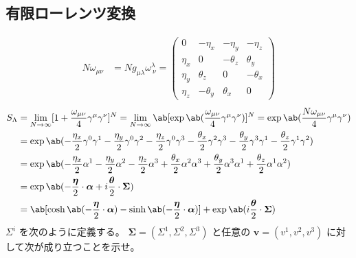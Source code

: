 \documentclass[uplatex,dvipdfmx,a4paper,11pt]{jlreq}
\theoremstyle{definition}
\numberwithin{equation}{section}
\begin{document}
\subsection{有限ローレンツ変換}
\begin{align}
  N\omega_{\mu\nu} & = Ng_{\mu\lambda}\omega_{\ \nu}^\lambda = \begin{pmatrix}
                                                                 0      & -\eta_x   & -\eta_y   & -\eta_z   \\
                                                                 \eta_x & 0         & -\theta_z & \theta_y  \\
                                                                 \eta_y & \theta_z  & 0         & -\theta_x \\
                                                                 \eta_z & -\theta_y & \theta_x  & 0
                                                               \end{pmatrix}
\end{align}
\begin{align}
  S_\Lambda & = \lim_{N\to\infty}[1 + \frac{\omega_{\mu\nu}}{4}\gamma^\mu\gamma^\nu]^N = \lim_{N\to\infty}\ab[\exp\ab(\frac{\omega_{\mu\nu}}{4}\gamma^\mu\gamma^\nu)]^N = \exp\ab(\frac{N\omega_{\mu\nu}}{4}\gamma^\mu\gamma^\nu)                \\
            & = \exp\ab(- \frac{\eta_x}{2}\gamma^0\gamma^1 - \frac{\eta_y}{2}\gamma^0\gamma^2 - \frac{\eta_z}{2}\gamma^0\gamma^3 - \frac{\theta_x}{2}\gamma^2\gamma^3 - \frac{\theta_y}{2}\gamma^3\gamma^1 - \frac{\theta_z}{2}\gamma^1\gamma^2) \\
            & = \exp\ab(- \frac{\eta_x}{2}\alpha^1 - \frac{\eta_y}{2}\alpha^2 - \frac{\eta_z}{2}\alpha^3 + \frac{\theta_x}{2}\alpha^2\alpha^3 + \frac{\theta_y}{2}\alpha^3\alpha^1 + \frac{\theta_z}{2}\alpha^1\alpha^2)                         \\
            & = \exp\ab(-\frac{\bm{\eta}}{2}\cdot\bm{\alpha} + i\frac{\bm{\theta}}{2}\cdot\bm{\Sigma})                                                                                                                                           \\
            & = \ab[\cosh\ab(-\frac{\bm{\eta}}{2}\cdot\bm{\alpha}) - \sinh\ab(-\frac{\bm{\eta}}{2}\cdot\bm{\alpha})] + \exp\ab(i\frac{\bm{\theta}}{2}\cdot\bm{\Sigma})
\end{align}
$\Sigma^i$ を次のように定義する。
$\bm{\Sigma} = (\Sigma^1, \Sigma^2, \Sigma^3)$ と任意の $\bm{v} = (v^1, v^2, v^3)$ に対して次が成り立つことを示せ。
\end{document}
